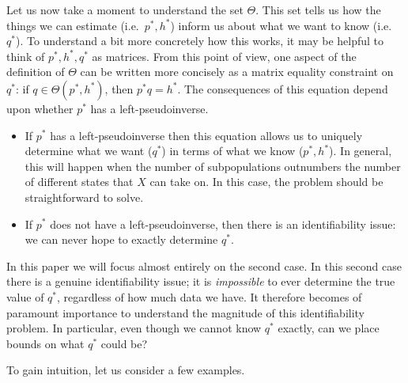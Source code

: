 Let us now take a moment to understand the set $\Theta$.  This set tells us how the things we can estimate (i.e.\ $p^*,h^*$) inform us about what we want to know (i.e.\ $q^*$).  To understand a bit more concretely how this works, it may be helpful to think of $p^*,h^*,q^*$ as matrices.  From this point of view, one aspect of the definition of $\Theta$ can be written more concisely as a matrix equality constraint on $q^*$: if $q \in \Theta(p^*,h^*)$, then $p^*q=h^*$.  The consequences of this equation depend upon whether $p^*$ has a left-pseudoinverse.
\begin{itemize}
    \item If $p^*$ has a left-pseudoinverse then this equation allows us to uniquely determine what we want ($q^*$) in terms of what we know ($p^*,h^*$).  In general, this will happen when the number of subpopulations outnumbers the number of different states that $X$ can take on.  In this case, the problem should be straightforward to solve.   
    \item If $p^*$ does not have a left-pseudoinverse, then there is an identifiability issue: we can never hope to exactly determine $q^*$.  
\end{itemize}

In this paper we will focus almost entirely on the second case.  In this second case there is a genuine identifiability issue;  it is \emph{impossible} to ever determine the true value of $q^*$, regardless of how much data we have.  It therefore becomes of paramount importance to understand the magnitude of this identifiability problem.  In particular, even though we cannot know $q^*$ exactly, can we place bounds on what $q^*$ could be?

To gain intuition, let us consider a few examples.\vspace{.1in}

